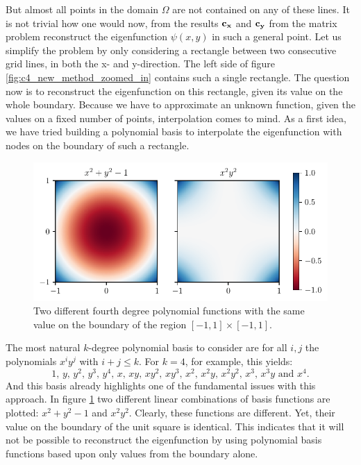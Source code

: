 But almost all points in the domain $\Omega$ are not contained on any of these lines. It is not trivial how one would now, from the results $\vb{c_x}$ and $\vb{c_y}$ from the matrix problem reconstruct the eigenfunction $\psi(x, y)$ in such a general point. Let us simplify the problem by only considering a rectangle between two consecutive grid lines, in both the x- and y-direction. The left side of figure \ref{fig:c4_new_method_zoomed_in} contains such a single rectangle. The question now is to reconstruct the eigenfunction on this rectangle, given its value on the whole boundary. Because we have to approximate an unknown function, given the values on a fixed number of points, interpolation comes to mind. As a first idea, we have tried building a polynomial basis to interpolate the eigenfunction with nodes on the boundary of such a rectangle.

\begin{figure}
    \begin{center}
        \includegraphics[width=1\textwidth]{img/chapter4/nm_interpolation.pdf}
    \end{center}
    \caption{Two different fourth degree polynomial functions with the same value on the boundary of the region $[-1, 1] \times [-1, 1]$.}\label{fig:c4_interpolation_boundary issue}
\end{figure}

The most natural $k$-degree polynomial basis to consider are for all $i, j$ the polynomials $x^i y^j$ with $i + j \leq k$. For $k = 4$, for example, this yields:
$$
    1\text{, } y\text{, } y^2\text{, } y^3\text{, } y^4\text{, } x\text{, } x y\text{, } x y^2\text{, } x y^3\text{, } x^2\text{, } x^2 y\text{, } x^2 y^2\text{, } x^3\text{, } x^3 y\text{ and } x^4\text{.}
$$
And this basis already highlights one of the fundamental issues with this approach. In figure \ref{fig:c4_interpolation_boundary issue} two different linear combinations of basis functions are plotted: $x^2 + y^2 -1$ and $x^2y^2$. Clearly, these functions are different. Yet, their value on the boundary of the unit square is identical. This indicates that it will not be possible to reconstruct the eigenfunction by using polynomial basis functions based upon only values from the boundary alone.

